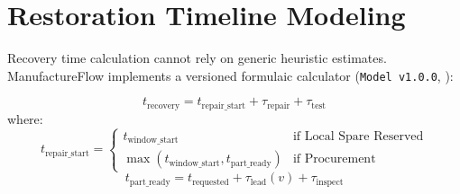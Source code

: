 \documentclass[10pt,twocolumn,a4paper]{article}
\begin{document}
\section{Restoration Timeline Modeling}
\label{sec:restoration_model}
Recovery time calculation cannot rely on generic heuristic estimates. ManufactureFlow implements a versioned formulaic calculator (\texttt{Model v1.0.0}, ):

\begin{equation}
    t_{\text{recovery}} = t_{\text{repair\_start}} + \tau_{\text{repair}} + \tau_{\text{test}}
\end{equation}
where:
\begin{equation}
    t_{\text{repair\_start}} = \begin{cases}
        t_{\text{window\_start}} & \text{if Local Spare Reserved} \\
        \max(t_{\text{window\_start}}, t_{\text{part\_ready}}) & \text{if Procurement}
    \end{cases}
\end{equation}
\begin{equation}
    t_{\text{part\_ready}} = t_{\text{requested}} + \tau_{\text{lead}}(v) + \tau_{\text{inspect}}
\end{equation}
\end{document}

